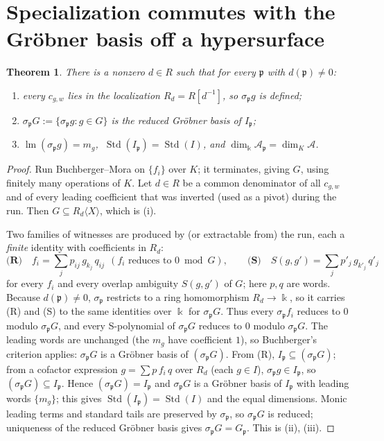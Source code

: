 \documentclass[11pt]{article}
\newtheorem{theorem}{Theorem}
\theoremstyle{definition}
\newcommand{\kk}{\Bbbk}
\newcommand{\A}{\mathcal{A}}
\newcommand{\Std}{\operatorname{Std}}
\newcommand{\lm}{\operatorname{lm}}
\newcommand{\pp}{\mathfrak{p}}
\begin{document}
\section{Specialization commutes with the Gr\"obner basis off a hypersurface}

\begin{theorem}\label{thm:spec}
There is a nonzero $d\in R$ such that for every $\pp$ with $d(\pp)\neq0$:
\begin{enumerate}
\item[\textup{(i)}] every $c_{g,w}$ lies in the localization $R_d=R[d^{-1}]$, so $\sigma_\pp g$ is defined;
\item[\textup{(ii)}] $\sigma_\pp G:=\{\sigma_\pp g:g\in G\}$ is the reduced Gr\"obner basis of $I_\pp$;
\item[\textup{(iii)}] $\lm(\sigma_\pp g)=m_g$, $\ \Std(I_\pp)=\Std(I)$, and $\dim_\kk\A_\pp=\dim_K\A$.
\end{enumerate}
\end{theorem}

\begin{proof}
Run Buchberger--Mora on $\{f_i\}$ over $K$; it terminates, giving $G$, using finitely many
operations of $K$. Let $d\in R$ be a common denominator of all $c_{g,w}$ and of every leading
coefficient that was inverted (used as a pivot) during the run. Then $G\subseteq R_d\langle X\rangle$,
which is (i).

Two families of witnesses are produced by (or extractable from) the run, each a \emph{finite}
identity with coefficients in $R_d$:
\[
  \textbf{(R)}\quad f_i=\sum_{j}p_{ij}\,g_{k_j}\,q_{ij}\ \ (\text{$f_i$ reduces to }0\bmod G),
  \qquad
  \textbf{(S)}\quad S(g,g')=\sum_{j}p'_{j}\,g_{k'_j}\,q'_{j}
\]
for every $f_i$ and every overlap ambiguity $S(g,g')$ of $G$; here $p,q$ are words. Because
$d(\pp)\neq0$, $\sigma_\pp$ restricts to a ring homomorphism $R_d\to\kk$, so it carries (R) and (S)
to the same identities over $\kk$ for $\sigma_\pp G$. Thus every $\sigma_\pp f_i$ reduces to $0$
modulo $\sigma_\pp G$, and every S-polynomial of $\sigma_\pp G$ reduces to $0$ modulo $\sigma_\pp G$.
The leading words are unchanged (the $m_g$ have coefficient $1$), so Buchberger's criterion applies:
$\sigma_\pp G$ is a Gr\"obner basis of $(\sigma_\pp G)$. From (R), $I_\pp\subseteq(\sigma_\pp G)$;
from a cofactor expression $g=\sum p\,f_{i}\,q$ over $R_d$ (each $g\in I$), $\sigma_\pp g\in I_\pp$, so
$(\sigma_\pp G)\subseteq I_\pp$. Hence $(\sigma_\pp G)=I_\pp$ and $\sigma_\pp G$ is a Gr\"obner basis
of $I_\pp$ with leading words $\{m_g\}$; this gives $\Std(I_\pp)=\Std(I)$ and the equal dimensions.
Monic leading terms and standard tails are preserved by $\sigma_\pp$, so $\sigma_\pp G$ is reduced;
uniqueness of the reduced Gr\"obner basis gives $\sigma_\pp G=G_\pp$. This is (ii), (iii).
\end{proof}
\end{document}
